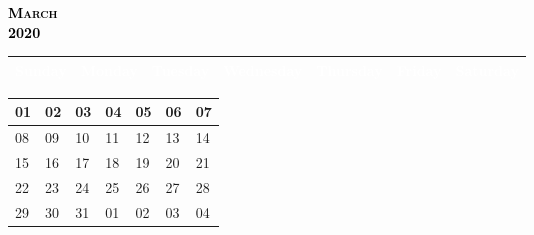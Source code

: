 \documentclass{article}
\newcommand{\daysize}{2.5cm}		%
\newcommand{\dw}{3.5cm}					%
\newcommand{\mkday}[1]{
  #1
  \vspace{\daysize}
}
\begin{document}
		\begin{center}
			\textsc{\LARGE \textbf{\textcolor{black}{
			March
			}}}\\ %
			\textsc{\large \textbf{\textcolor{black}{
			2020
			}}} %
		\end{center}

		\begin{center}
		\begin{tabular}{| p{\dw} | p{\dw} | p{\dw} | p{\dw} | p{\dw} | p{\dw} | p{\dw} |}
			\hline
			\cellcolor{bannercolor} \textcolor{white}{Sunday} &
			\cellcolor{bannercolor} \textcolor{white}{Monday} &
			\cellcolor{bannercolor} \textcolor{white}{Tuesday} &
			\cellcolor{bannercolor} \textcolor{white}{Wednesday} &
			\cellcolor{bannercolor} \textcolor{white}{Thursday} &
			\cellcolor{bannercolor} \textcolor{white}{Friday} &
			\cellcolor{bannercolor} \textcolor{white}{Saturday} \\
			\hline
		\end{tabular}

		\vspace{0.1cm}

		\begin{tabular}{| p{\dw} | p{\dw} | p{\dw} | p{\dw} | p{\dw} | p{\dw} | p{\dw} |}
\hline 
\cellcolor{weekendcolor}\mkday{
    01
} & 
\mkday{
    02
} &
\mkday{
    03
} &
\mkday{
    04
} &
\mkday{
    05
} &
\mkday{
    06
} &
\cellcolor{weekendcolor}\mkday{
    07
} 
\\
\hline 
\cellcolor{weekendcolor}\mkday{
    08
} & 
\mkday{
    09
} &
\mkday{
    10
} &
\mkday{
    11
} &
\mkday{
    12
} &
\mkday{
    13
} &
\cellcolor{weekendcolor}\mkday{
    14
} 
\\
\hline 
\cellcolor{weekendcolor}\mkday{
    15
} & 
\mkday{
    16
} &
\mkday{
    17
} &
\mkday{
    18
} &
\mkday{
    19
} &
\mkday{
    20
} &
\cellcolor{weekendcolor}\mkday{
    21
} 
\\
\hline 
\cellcolor{weekendcolor}\mkday{
    22
} & 
\mkday{
    23
} &
\mkday{
    24
} &
\mkday{
    25
} &
\mkday{
    26
} &
\mkday{
    27
} &
\cellcolor{weekendcolor}\mkday{
    28
} 
\\
\hline 
\cellcolor{weekendcolor}\mkday{
    29
} & 
\mkday{
    30
} &
\mkday{
    31
} &
\mkday{
    01
} &
\mkday{
    02
} &
\mkday{
    03
} &
\cellcolor{weekendcolor}\mkday{
    04
} 
\\
		\end{tabular}

		\end{center}
\end{document}
